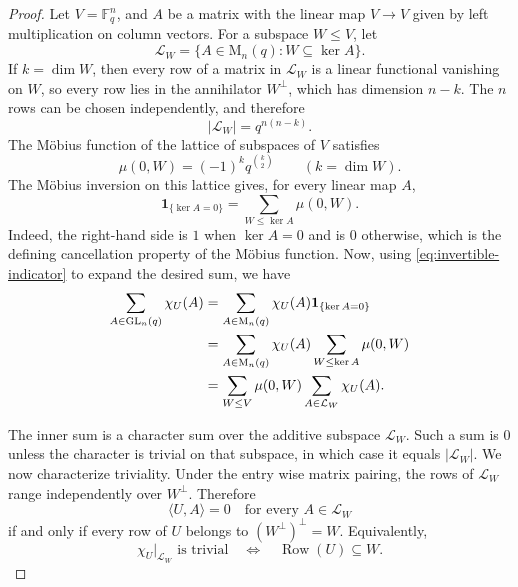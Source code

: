 \documentclass[11pt]{article}
\theoremstyle{definition}
\DeclareMathOperator{\Row}{Row}
\newcommand{\F}{\mathbb{F}}
\newcommand{\Mat}{\mathrm{M}}
\newcommand{\GL}{\mathrm{GL}}
\newcommand{\ind}{\mathbf{1}}
\begin{document}
\begin{proof}
Let $V=\F_q^n$, and $A$ be a matrix with the linear map $V\to V$ given by left multiplication on column vectors.  For a subspace
$W\le V$, let
\[
  \mathcal L_W=\{A\in\Mat_n(q):W\subseteq\ker A\}.
\]
If $k=\dim W$, then every row of a matrix in $\mathcal L_W$ is a linear functional vanishing on $W$, so every row lies in the annihilator $W^\perp$, which has dimension $n-k$.  The $n$ rows can be chosen independently, and therefore
\begin{equation}\label{eq:L-W-size}
  |\mathcal L_W|=q^{n(n-k)}.
\end{equation}
The M\"obius function of the lattice of subspaces of $V$ satisfies
\begin{equation}\label{eq:subspace-mobius}
  \mu(0,W)=(-1)^kq^{\binom{k}{2}}
  \qquad (k=\dim W).
\end{equation}
The M\"obius inversion on this lattice gives, for every linear map $A$,
\begin{equation}\label{eq:invertible-indicator}
  \ind_{\{\ker A=0\}}
  =\sum_{W\le\ker A}\mu(0,W).
\end{equation}
Indeed, the right-hand side is $1$ when $\ker A=0$ and is $0$ otherwise, which is the defining cancellation property of the M\"obius function. Now, using \eqref{eq:invertible-indicator} to expand the desired sum, we have
\begin{align}
 \sum_{A\in\GL_n(q)}\chi_U(A)
 &=\sum_{A\in\Mat_n(q)}
   \chi_U(A)\ind_{\{\ker A=0\}}\notag\\
 &=\sum_{A\in\Mat_n(q)}\chi_U(A)
   \sum_{W\le\ker A}\mu(0,W)\notag\\
 &=\sum_{W\le V}\mu(0,W)
   \sum_{A\in\mathcal L_W}\chi_U(A).                    \label{eq:mobius-expanded}
\end{align}

The inner sum is a character sum over the additive subspace $\mathcal L_W$.  Such a sum is $0$ unless the character is trivial on that
subspace, in which case it equals $|\mathcal L_W|$.  We now characterize triviality.  Under the entry wise matrix pairing, the rows of
$\mathcal L_W$ range independently over $W^\perp$.  Therefore
\[
  \langle U,A\rangle=0\quad\text{for every }A\in\mathcal L_W
\]
if and only if every row of $U$ belongs to $(W^\perp)^\perp=W$.  Equivalently,
\begin{equation}\label{eq:row-condition}
  \chi_U|_{\mathcal L_W}\text{ is trivial}
  \quad\Longleftrightarrow\quad
  \Row(U)\subseteq W.
\end{equation}


\end{proof}
\end{document}
